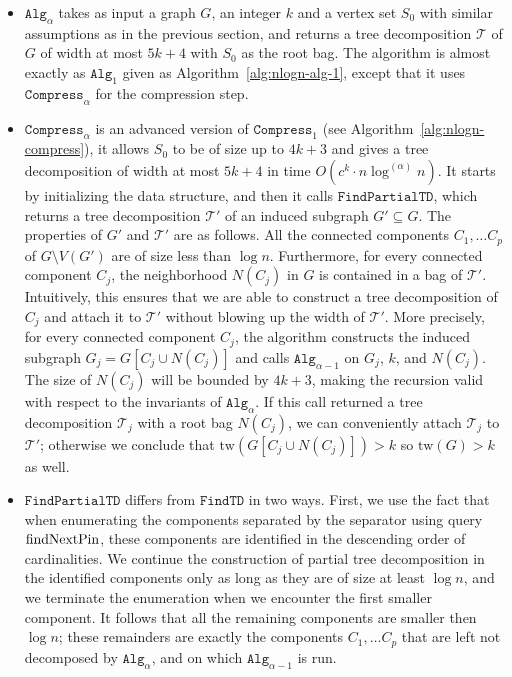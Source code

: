 \documentclass[a4paper,11pt]{article}
\theoremstyle{definition}
\theoremstyle{remark}
\newcommand{\depth}{\alpha}
\newcommand{\findTD}{\mathtt{FindTD}}
\newcommand{\findPTD}{\mathtt{FindPartialTD}}
\newcommand{\compress}[1]{\mathtt{Compress}_{#1}}
\newcommand{\alg}[1]{\mathtt{Alg}_{#1}}
\newcommand{\qpin}{\textnormal{findNextPin}}
\newcommand{\td}{\mathcal{T}} \newcommand{\tw}{\mathrm{tw}} \newcommand{\w}{\mathrm{w}}
\begin{document}
\begin{itemize}
\item $\alg{\depth}$ takes as input a graph $G$, an integer $k$ and a
  vertex set $S_0$ with similar assumptions as in the previous
  section, and returns a tree decomposition $\td$ of $G$ of width at
  most $5k+4$ with $S_0$ as the root bag.  The algorithm is almost
  exactly as $\alg{1}$ given as Algorithm~\ref{alg:nlogn-alg-1},
  except that it uses $\compress{\depth}$ for the compression step.
\item $\compress{\depth}$ is an advanced version of $\compress{1}$
  (see Algorithm~\ref{alg:nlogn-compress}), it allows $S_0$ to be of
  size up to $4k+3$ and gives a tree decomposition of width at most
  $5k+4$ in time $O(c^k\cdot n\log^{(\alpha)}n)$.  It starts by
  initializing the data structure, and then it calls $\findPTD$, which
  returns a tree decomposition $\td'$ of an induced subgraph $G'
  \subseteq G$.  The properties of $G'$ and $\td'$ are as follows.
  All the connected components $C_1, \dots C_p$ of $G\setminus V(G')$
  are of size less than $\log n$.  Furthermore, for every connected
  component $C_j$, the neighborhood $N(C_j)$ in $G$ is contained in a
  bag of $\td'$.  Intuitively, this ensures that we are able to
  construct a tree decomposition of $C_j$ and attach it to $\td'$
  without blowing up the width of $\td'$.  More precisely, for every
  connected component $C_j$, the algorithm constructs the induced
  subgraph $G_j = G[C_j \cup N(C_j)]$ and calls $\alg{\depth-1}$ on
  $G_j$, $k$, and $N(C_j)$. The size of $N(C_j)$ will be bounded by
  $4k+3$, making the recursion valid with respect to the invariants of
  $\alg{\alpha}$. If this call returned a tree decomposition $\td_j$
  with a root bag $N(C_j)$, we can conveniently attach $\td_j$ to
  $\td'$; otherwise we conclude that $\tw(G[C_j \cup N(C_j)])>k$ so
  $\tw(G)>k$ as well.
\item $\findPTD$ differs from $\findTD$ in two ways.  First, we use
  the fact that when enumerating the components separated by the
  separator using query $\qpin$, these components are identified in
  the descending order of cardinalities.  We continue the construction
  of partial tree decomposition in the identified components only as
  long as they are of size at least $\log n$, and we terminate the
  enumeration when we encounter the first smaller component.  It
  follows that all the remaining components are smaller then $\log n$;
  these remainders are exactly the components $C_1, \dots C_p$ that
  are left not decomposed by $\alg{\depth}$, and on which
  $\alg{\depth-1}$ is run.
  

\end{itemize}
\end{document}
